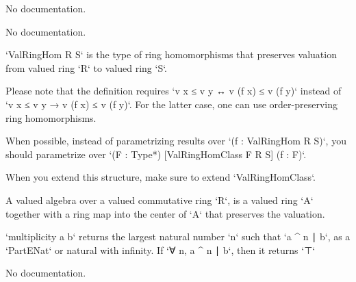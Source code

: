 \begin{theorem}\label{Valuation.isEquiv_of_finiteDimensional}
                No documentation.
    \end{theorem}

\begin{definition}\label{AlgEquiv.toValAlgEquiv}
                No documentation.
    \end{definition}

\begin{definition}\label{ValRingHom}
        \leanok
                `ValRingHom R S` is the type of ring homomorphisms that preserves valuation from valued ring `R` to valued ring `S`.

Please note that the definition requires `v x ≤ v y ↔ v (f x) ≤ v (f y)` instead of `v x ≤ v y → v (f x) ≤ v (f y)`. For the latter case, one can use order-preserving ring homomorphisms.

When possible, instead of parametrizing results over `(f : ValRingHom R S)`,
you should parametrize over `(F : Type*) [ValRingHomClass F R S] (f : F)`.

When you extend this structure, make sure to extend `ValRingHomClass`.
    \end{definition}

\begin{definition}\label{ValAlgebra}
        \leanok
                A valued algebra over a valued commutative ring `R`, is a valued ring `A` together with a ring map into the center of `A` that preserves the valuation.
    \end{definition}

\begin{definition}\label{multiplicity'}
        \leanok
                `multiplicity a b` returns the largest natural number `n` such that
  `a ^ n ∣ b`, as a `PartENat` or natural with infinity. If `∀ n, a ^ n ∣ b`,
  then it returns `⊤`
    \end{definition}

\begin{theorem}\label{finite_nat_iff'}
                No documentation.
    \end{theorem}

